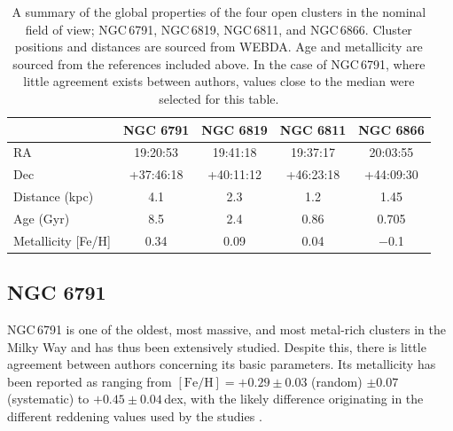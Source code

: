 \begin{table}[h]
    \setlength\tabcolsep{10pt}
    \centering
    \begin{tabular}{lcccc}
        \hline
                        & NGC 6791 & NGC 6819 & NGC 6811 & NGC 6866 \\
        \hline
        \hline
        RA                      & 19:20:53 & 19:41:18 & 19:37:17 & 20:03:55 \\
        Dec                     & +37:46:18 & +40:11:12 & +46:23:18 & +44:09:30 \\
        Distance (kpc)          & 4.1 & 2.3 & 1.2 & 1.45 \\
        Age (Gyr)              & 8.5 & 2.4 & 0.86 & 0.705 \\
        Metallicity [Fe/H]      & 0.34 & 0.09 & 0.04 & $-$0.1\\
        \hline
        
    \end{tabular}
    \caption[A summary of the global properties of the four open clusters in the nominal \Kepler field of view]{A summary of the global properties of the four open clusters in the nominal \Kepler field of view; NGC\,6791, NGC\,6819, NGC\,6811, and NGC\,6866. Cluster positions and distances are sourced from WEBDA. Age and metallicity are sourced from the references included above. In the case of NGC\,6791, where little agreement exists between authors, values close to the median were selected for this table.}
    \label{tab:cluster_properties}
\end{table}

\subsection{NGC 6791}

NGC\,6791 is one of the oldest, most massive, and most metal-rich clusters in the Milky Way and has thus been extensively studied. Despite this, there is little agreement between authors concerning its basic parameters. Its metallicity has been reported as ranging from $[\mathrm{Fe/H}] = +0.29 \pm 0.03$ (random) $\pm 0.07$ (systematic) to $+0.45 \pm 0.04$\,dex, with the likely difference originating in the different reddening values used by the studies \cite[eg.][and references therein]{villanova_ngc_2018, cunha_sodium_2015}.

